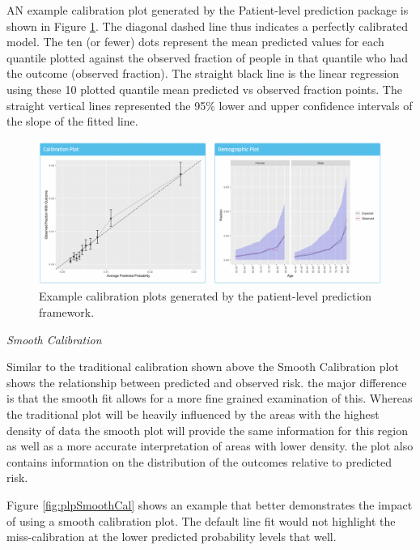 \documentclass[11pt]{book}
\theoremstyle{definition}
\theoremstyle{definition}
\theoremstyle{definition}
\theoremstyle{remark}
\begin{document}
AN example calibration plot generated by the Patient-level prediction package is shown in Figure \ref{fig:figuretheorycal}. The diagonal dashed line thus indicates a perfectly calibrated model. The ten (or fewer) dots represent the mean predicted values for each quantile plotted against the observed fraction of people in that quantile who had the outcome (observed fraction). The straight black line is the linear regression using these 10 plotted quantile mean predicted vs observed fraction points. The straight vertical lines represented the 95\% lower and upper confidence intervals of the slope of the fitted line.

\begin{figure}
\includegraphics[width=1\linewidth]{images/PatientLevelPrediction/theory/calibration} \caption{Example calibration plots generated by the patient-level prediction framework.}\label{fig:figuretheorycal}
\end{figure}

\emph{Smooth Calibration}

Similar to the traditional calibration shown above the Smooth Calibration plot shows the relationship between predicted and observed risk. the major difference is that the smooth fit allows for a more fine grained examination of this. Whereas the traditional plot will be heavily influenced by the areas with the highest density of data the smooth plot will provide the same information for this region as well as a more accurate interpretation of areas with lower density. the plot also contains information on the distribution of the outcomes relative to predicted risk.

Figure \ref{fig:plpSmoothCal} shows an example that better demonstrates the impact of using a smooth calibration plot. The default line fit would not highlight the miss-calibration at the lower predicted probability levels that well.
\end{document}
